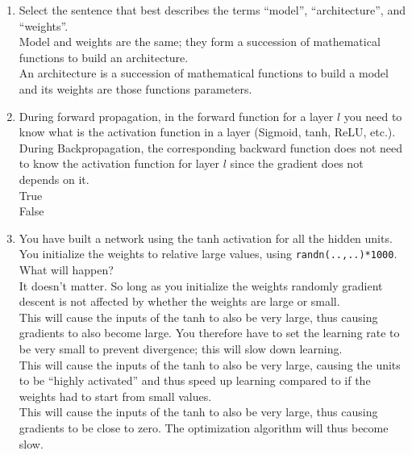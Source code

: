 \begin{enumerate}
        \item Select the sentence that best describes the terms ``model'', ``architecture'', and ``weights''. \\ 
        \hspace{1cm}\choice{} Model and weights are the same; they form a succession of mathematical functions to build an architecture. \\ 
        \hspace{1cm}\checkmark{} An architecture is a succession of mathematical functions to build a model and its weights are those functions parameters. \\ 
        \solution{}
    
    \item  During forward propagation, in the forward function for a layer $l$ you need to know what is the activation function in a layer (Sigmoid, tanh, ReLU, etc.). During Backpropagation, the corresponding backward function does not need to know the activation function for layer $l$ since the gradient does not depends on it. \\
        \hspace{1cm}\choice{} True \\
        \hspace{1cm}\checkmark{} False \\ 
        \solution{}

    \item You have built a network using the tanh activation for all the hidden units. You initialize the weights to relative large values, using {\tt randn(..,..)*1000}. What will happen?  \\ 
    \hspace{1cm}\choice{} It doesn't matter. So long as you initialize the weights randomly gradient descent is not affected by whether the weights are large or small. \\ 
    \hspace{1cm}\choice{} This will cause the inputs of the tanh to also be very large, thus causing gradients to also become large. You therefore have to set the learning rate to be very small to prevent divergence; this will slow down learning.\\ 
    \hspace{1cm}\choice{}  This will cause the inputs of the tanh to also be very large, causing the units to be “highly activated” and thus speed up learning compared to if the weights had to start from small values. \\ 
    \hspace{1cm}\checkmark{}  This will cause the inputs of the tanh to also be very large, thus causing gradients to be close to zero. The optimization algorithm will thus become slow. \\ 
    \solution{}


\end{enumerate}
